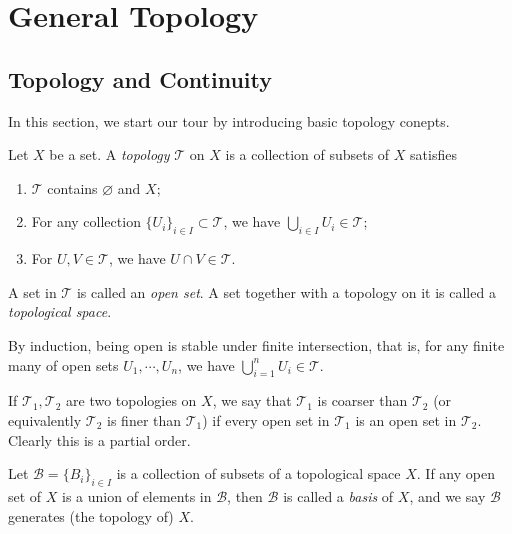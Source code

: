 \chapter{General Topology}

\section{Topology and Continuity}

In this section, we start our tour by introducing basic topology conepts.

\begin{defn}
    Let $X$ be a set.
    A \emph{topology} $\mathcal{T}$ on $X$ is a collection of subsets of $X$ satisfies
    \begin{enumerate}[(1)]
        \item $\mathcal{T}$ contains $\varnothing$ and $X$;
        \item For any collection $\{U_i\}_{i\in I}\subset\mathcal{T}$, we have $\bigcup_{i\in I}U_i\in\mathcal{T}$;
        \item For $U,V\in\mathcal{T}$, we have $U\cap V\in\mathcal{T}$.
    \end{enumerate}
    A set in $\mathcal{T}$ is called an \emph{open set}.
    A set together with a topology on it is called a \emph{topological space}.
\end{defn}

\begin{rem}
    By induction, being open is stable under finite intersection, that is, for any finite many of open sets $U_1,\cdots,U_n$, we have $\bigcup_{i=1}^nU_i\in\mathcal{T}$.
\end{rem}

\begin{defn}
    If $\mathcal{T}_1,\mathcal{T}_2$ are two topologies on $X$, we say that $\mathcal{T}_1$ is coarser than $\mathcal{T}_2$ (or equivalently $\mathcal{T}_2$ is finer than $\mathcal{T}_1$) if every open set in $\mathcal{T}_1$ is an open set in $\mathcal{T}_2$.
    Clearly this is a partial order. 
\end{defn}

\begin{defn}
    Let $\mathcal{B}=\{B_i\}_{i\in I}$ is a collection of subsets of a topological space $X$.
    If any open set of $X$ is a union of elements in $\mathcal{B}$, then $\mathcal{B}$ is called a \emph{basis} of $X$, and we say $\mathcal{B}$ generates (the topology of) $X$.
\end{defn}

